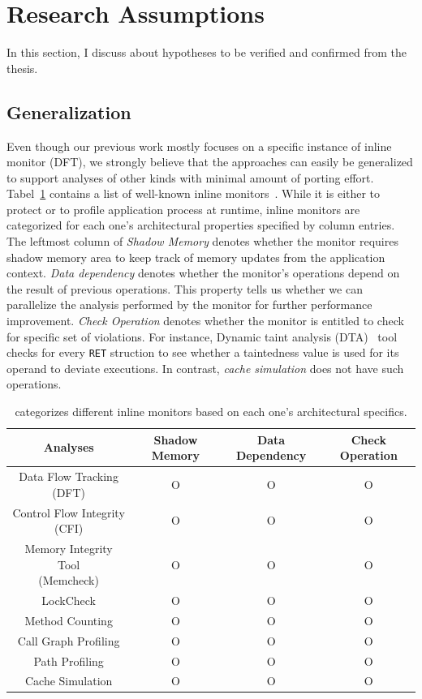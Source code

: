 \section{Research Assumptions} \label{sec:hypo} 

In this section, I discuss about hypotheses to be verified and confirmed
from the thesis.

\subsection{\sreplica Generalization}

Even though our previous work mostly focuses on a specific instance of inline
monitor (\ie DFT), we strongly believe that the approaches can easily be
generalized to support analyses of other kinds with minimal amount of porting
effort. Tabel~\ref{tab:analyses} contains a list of well-known inline
monitors~\cite{cab:oopsala2009}. While it is either to protect or to profile
application process at runtime, inline monitors are categorized for each one's
architectural properties specified by column entries.  The leftmost column of
{\it Shadow Memory} denotes whether the monitor requires shadow memory area to
keep track of memory updates from the application context. {\it Data
dependency} denotes whether the monitor's operations depend on the result of
previous operations. This property tells us whether we can parallelize the
analysis performed by the monitor for further performance improvement. {\it
Check Operation} denotes whether the monitor is entitled to check for specific
set of violations. For instance, Dynamic taint analysis
(DTA)~\cite{taintcheck:ndss2005} tool checks for every {\tt RET} struction to
see whether a taintedness value is used for its operand to deviate executions.
In contrast, {\it cache simulation} does not have such operations.

\begin{table}[h]
    \centering
\begin{tabular}{|c|c|c|c|}
\hline
Analyses & Shadow Memory & Data Dependency & Check Operation \\ 
\hline \hline
Data Flow Tracking (DFT) & O & O & O \\ \hline
Control Flow Integrity (CFI) & O & O & O \\ \hline
\specialcell{Memory Integrity Tool \\ (Memcheck)} & O & O & O \\ \hline
LockCheck & O & O & O \\ \hline
Method Counting & O & O & O \\ \hline
Call Graph Profiling & O & O & O \\ \hline
Path Profiling & O & O & O \\ \hline
Cache Simulation & O & O & O \\ \hline
\end{tabular}
\caption{ categorizes different inline monitors based on each one's
architectural specifics. \label{tab:analyses}}
\end{table}

